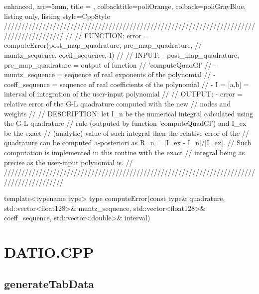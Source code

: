 \documentclass[a4paper, twosided]{book}
\begin{document}
\begin{tcblisting}{enhanced,
                   arc=5mm,
                   title = \color{black}{\large \ttfamily MonMap.cpp/computeError},
                   colbacktitle=poliOrange,
                   colback=poliGrayBlue,
                   listing only,
                   listing style=CppStyle}
/////////////////////////////////////////////////////////////////////////////////////////
//
//       FUNCTION: error = computeError({post_map_quadrature, pre_map_quadrature}, 
//                                       muntz_sequence, coeff_sequence, I)
//                
//          INPUT: - {post_map_quadrature, pre_map_quadrature} = output of function
//                                                               'computeQuadGl'
//                 - muntz_sequence = sequence of real exponents of the polynomial
//                 - coeff_sequence = sequence of real coefficients of the polynomial
//                 - I = [a,b] = interval of integration of the user-input polynomial
//
//         OUTPUT: - error = relative error of the G-L quadrature computed with the new
//                           nodes and weights
//
//    DESCRIPTION: let I_n be the numerical integral calculated using the G-L quadrature
//                 rule (outputed by function 'computeQuadGl') and I_ex be the exact
//                 (analytic) value of such integral then the relative error of the 
//                 quadrature can be computed a-posteriori as R_n = |I_ex - I_n|/|I_ex|.
//                 Such computation is implemented in this routine with the exact 
//                 integral being as precise as the user-input polynomial is.
//
/////////////////////////////////////////////////////////////////////////////////////////

template<typename type>
type computeError(const type& quadrature, std::vector<float128>& muntz_sequence, std::vector<float128>& coeff_sequence, std::vector<double>& interval)
\end{tcblisting}


\newpage
\section[DatIo.cpp]{\changefont DATIO.CPP}\label{Sec4.2}

\subsection[generateTabData]{\changefont generateTabData}\label{SubSec4.2.1}
\end{document}
